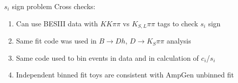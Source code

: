 \documentclass{beamer}
\begin{document}
\begin{frame}{$s_i$ sign problem}
  Cross checks:
  \vspace{0.3cm}
  \begin{enumerate}
    \setlength\itemsep{1.5em}
    \item{Can use BESIII data with $KK\pi\pi$ vs $K_{S, L}\pi\pi$ tags to check $s_i$ sign}
    \item{Same fit code was used in $B\to Dh$, $D\to K_S\pi\pi$ analysis}
    \item{Same code used to bin events in data and in calculation of $c_i$/$s_i$}
    \item{Independent binned fit toys are consistent with AmpGen unbinned fit}
  \end{enumerate}
\end{frame}
\end{document}
